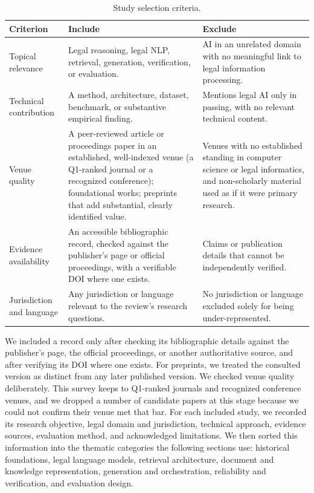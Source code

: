 \begin{table}[t]
\centering
\caption{Study selection criteria.}
\label{tab:sel}
\footnotesize
\setlength{\tabcolsep}{5pt}
\renewcommand{\arraystretch}{1.25}
\begin{tabularx}{\textwidth}{>{\raggedright\arraybackslash}p{2.6cm} >{\raggedright\arraybackslash}X >{\raggedright\arraybackslash}X}
\toprule
\textbf{Criterion} & \textbf{Include} & \textbf{Exclude} \\
\midrule
Topical relevance & Legal reasoning, legal NLP, retrieval, generation, verification, or evaluation. & AI in an unrelated domain with no meaningful link to legal information processing. \\
Technical contribution & A method, architecture, dataset, benchmark, or substantive empirical finding. & Mentions legal AI only in passing, with no relevant technical content. \\
Venue quality & A peer-reviewed article or proceedings paper in an established, well-indexed venue (a Q1-ranked journal or a recognized conference); foundational works; preprints that add substantial, clearly identified value. & Venues with no established standing in computer science or legal informatics, and non-scholarly material used as if it were primary research. \\
Evidence availability & An accessible bibliographic record, checked against the publisher's page or official proceedings, with a verifiable DOI where one exists. & Claims or publication details that cannot be independently verified. \\
Jurisdiction and language & Any jurisdiction or language relevant to the review's research questions. & No jurisdiction or language excluded solely for being under-represented. \\
\bottomrule
\end{tabularx}
\end{table}

We included a record only after checking its bibliographic details against the publisher's page,
the official proceedings, or another authoritative source, and after verifying its DOI where one
exists. For preprints, we treated the consulted version as distinct from any later published
version. We checked venue quality deliberately. This survey keeps to Q1-ranked journals and
recognized conference venues, and we dropped a number of candidate papers at this stage because we
could not confirm their venue met that bar. For each included study, we recorded its research
objective, legal domain and jurisdiction, technical approach, evidence sources, evaluation method,
and acknowledged limitations. We then sorted this information into the thematic categories the
following sections use: historical foundations, legal language models, retrieval architecture,
document and knowledge representation, generation and orchestration, reliability and verification,
and evaluation design.

